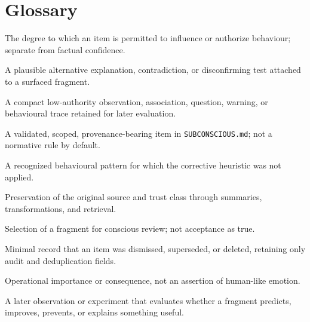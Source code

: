 \documentclass[11pt,a4paper]{article}
\begin{document}
\section{Glossary}

\begin{description}[style=nextline,leftmargin=0pt]
\item[Authority] The degree to which an item is permitted to influence or authorize behaviour; separate from factual confidence.
\item[Counterdream] A plausible alternative explanation, contradiction, or disconfirming test attached to a surfaced fragment.
\item[Dream fragment] A compact low-authority observation, association, question, warning, or behavioural trace retained for later evaluation.
\item[Durable memory] A validated, scoped, provenance-bearing item in \texttt{SUBCONSCIOUS.md}; not a normative rule by default.
\item[Lucidity debt] A recognized behavioural pattern for which the corrective heuristic was not applied.
\item[Origin binding] Preservation of the original source and trust class through summaries, transformations, and retrieval.
\item[Surfacing] Selection of a fragment for conscious review; not acceptance as true.
\item[Tombstone] Minimal record that an item was dismissed, superseded, or deleted, retaining only audit and deduplication fields.
\item[Valence] Operational importance or consequence, not an assertion of human-like emotion.
\item[Waking test] A later observation or experiment that evaluates whether a fragment predicts, improves, prevents, or explains something useful.
\end{description}
\end{document}
